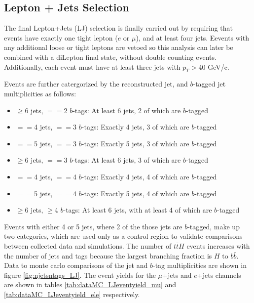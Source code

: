 \subsection{Lepton + Jets Selection}
\label{LJ_selection_overview}

\par The final Lepton+Jets (LJ) selection is finally carried out by
requiring that events have exactly one tight lepton ($e$ or
$\mu$), and at least four jets. Eevents with any additional loose or
tight leptons are vetoed so this analysis can later be combined with a
diLepton final state, without double counting events. Additionally,
each event must have at least three jets with $p_{T} > 40$ GeV/c.

\par Events are further catergorized by the reconstructed jet, and
$b$-tagged jet multiplicities as follows:

\begin{itemize}
  \item $\ge$6 jets,  $==$2 $b$-tags: At least 6 jets, 2 of which are $b$-tagged 
  \item $==$4 jets, $==$3 $b$-tags: Exactly 4 jets, 3 of which are $b$-tagged 
  \item $==$5 jets, $==$3 $b$-tags: Exactly 5 jets, 3 of which are $b$-tagged 
  \item $\ge$6 jets, $==$3 $b$-tags: At least 6 jets, 3 of which are $b$-tagged 
  \item $==$4 jets, $==$4 $b$-tags: Exactly 4 jets, 4 of which are $b$-tagged 
  \item $==$5 jets, $==$4 $b$-tags: Exactly 5 jets, 4 of which are $b$-tagged 
  \item $\ge$6 jets, $\ge$4 $b$-tags: At least 6 jets, with at least 4 of which are $b$-tagged 
\end{itemize}

\noindent Events with either 4 or 5 jets, where 2 of the those jets
are $b$-tagged, make up two categories, which are used only as a
control region to validate comparisons between collected data and
simulations.  The number of $t\bar{t}H$ events increases with the
number of jets and tags because the largest branching fraction is $H$
to $b\bar{b}$.  Data to monte carlo comparisons of the jet and $b$-tag
multiplicities are shown in figure \ref{fig:njetsntags_LJ}.  The event
yields for the $\mu$+jets and $e$+jets channels are shown in tables
\ref{tab:dataMC_LJeventyield_mu} and \ref{tab:dataMC_LJeventyield_ele}
respectively. 


